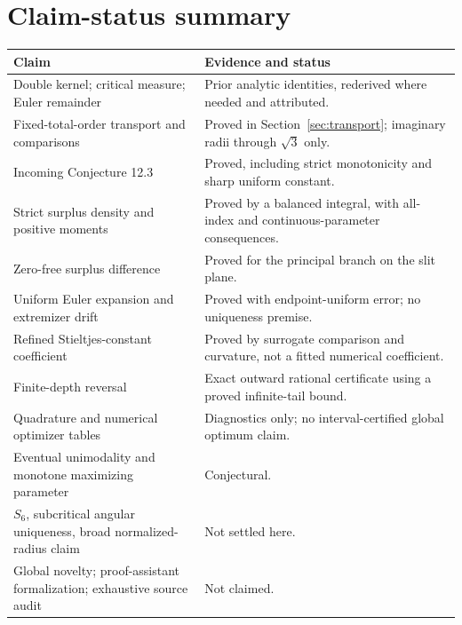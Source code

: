 \documentclass[11pt]{article}
\numberwithin{equation}{section}
\theoremstyle{definition}\newtheorem{definition}[theorem]{Definition}
\theoremstyle{remark}\newtheorem{remark}[theorem]{Remark}
\begin{document}
\appendix
\section{Claim-status summary}
\small
\begin{longtable}{@{}>{\raggedright\arraybackslash}p{}>{\raggedright\arraybackslash}p{}@{}}
\toprule
Claim & Evidence and status\\\midrule\endhead
Double kernel; critical measure; Euler remainder & Prior analytic identities, rederived where needed and attributed.\\[3pt]
Fixed-total-order transport and comparisons & Proved in Section~\ref{sec:transport}; imaginary radii through $\sqrt3$ only.\\[3pt]
Incoming Conjecture 12.3 & Proved, including strict monotonicity and sharp uniform constant.\\[3pt]
Strict surplus density and positive moments & Proved by a balanced integral, with all-index and continuous-parameter consequences.\\[3pt]
Zero-free surplus difference & Proved for the principal branch on the slit plane.\\[3pt]
Uniform Euler expansion and extremizer drift & Proved with endpoint-uniform error; no uniqueness premise.\\[3pt]
Refined Stieltjes-constant coefficient & Proved by surrogate comparison and curvature, not a fitted numerical coefficient.\\[3pt]
Finite-depth reversal & Exact outward rational certificate using a proved infinite-tail bound.\\[3pt]
Quadrature and numerical optimizer tables & Diagnostics only; no interval-certified global optimum claim.\\[3pt]
Eventual unimodality and monotone maximizing parameter & Conjectural.\\[3pt]
$S_6$, subcritical angular uniqueness, broad normalized-radius claim & Not settled here.\\[3pt]
Global novelty; proof-assistant formalization; exhaustive source audit & Not claimed.\\
\bottomrule
\end{longtable}
\normalsize
\end{document}
